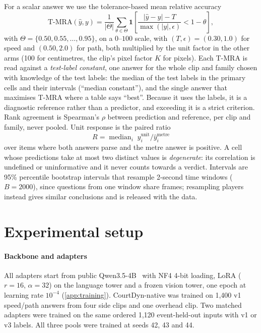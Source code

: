 \documentclass[preprint,number]{elsarticle}
\newcommand{\rhosp}{\ensuremath{\rho}}
\begin{document}
For a scalar answer we use the tolerance-based mean relative accuracy
\begin{equation}
\label{eq:tmra}
\mathrm{T\text{-}MRA}(\hat{y}, y) =
\frac{1}{|\Theta|}\sum_{\theta \in \Theta}
\mathbf{1}\!\left[\frac{|\hat{y}-y| - T}{\max(|y|, \epsilon)} < 1-\theta\right],
\end{equation}
with $\Theta = \{0.50, 0.55, \ldots, 0.95\}$, on a $0$--$100$ scale, with $(T,\epsilon)=(0.30,1.0)$ for speed and
$(0.50,2.0)$ for path, both multiplied by the unit factor in the other arms (100 for
centimetres, the clip's pixel factor $K$ for pixels). Each T-MRA is read against a
\emph{test-label constant}, one answer for the whole clip and family chosen
with knowledge of the test labels: the median of the test labels in the
primary cells and their intervals (``median constant''), and the single answer
that maximises T-MRA where a table says ``best''. Because it uses the labels,
it is a diagnostic reference rather than a predictor, and exceeding it is a
strict criterion. Rank
agreement is Spearman's \rhosp{} between prediction and reference, per clip and
family, never pooled. Unit response is the paired ratio
\begin{equation}
R = \operatorname{median}_{i}\;\hat y_i^{\mathrm{unit}}/\hat y_i^{\mathrm{metre}}
\label{eq:pairedratio}
\end{equation}
over items where both answers parse and the metre answer is positive. A cell
whose predictions take at most two distinct values is \emph{degenerate}: its
correlation is undefined or uninformative and it never counts towards a
verdict. Intervals are 95\% percentile bootstrap intervals that resample
2-second time windows ($B=2000$), since questions from one window share frames;
resampling players instead gives similar conclusions and is released with the
data.

\section{Experimental setup}
\label{sec:setup}

\paragraph{Backbone and adapters}
All adapters start from public Qwen3.5-4B~\cite{qwen3_2025,qwen35_4b_card} with NF4 4-bit loading, LoRA
($r=16$, $\alpha=32$) on the language tower and a frozen vision tower, one
epoch at learning rate $10^{-4}$ (\ref{app:training}). CourtDyn-native was
trained on 1,400 v1 speed/path answers from four side clips and one overhead
clip. Two matched adapters were trained on the same ordered 1,120
event-held-out inputs with v1 or v3 labels. All three pools were trained at
seeds 42, 43 and 44.
\end{document}
